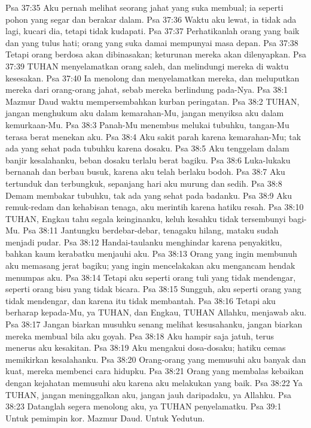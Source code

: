 Psa 37:35  Aku pernah melihat seorang jahat yang suka membual; ia seperti pohon yang segar dan berakar dalam.
Psa 37:36  Waktu aku lewat, ia tidak ada lagi, kucari dia, tetapi tidak kudapati.
Psa 37:37  Perhatikanlah orang yang baik dan yang tulus hati; orang yang suka damai mempunyai masa depan.
Psa 37:38  Tetapi orang berdosa akan dibinasakan; keturunan mereka akan dilenyapkan.
Psa 37:39  TUHAN menyelamatkan orang saleh, dan melindungi mereka di waktu kesesakan.
Psa 37:40  Ia menolong dan menyelamatkan mereka, dan meluputkan mereka dari orang-orang jahat, sebab mereka berlindung pada-Nya.
Psa 38:1  Mazmur Daud waktu mempersembahkan kurban peringatan.
Psa 38:2  TUHAN, jangan menghukum aku dalam kemarahan-Mu, jangan menyiksa aku dalam kemurkaan-Mu.
Psa 38:3  Panah-Mu menembus melukai tubuhku, tangan-Mu terasa berat menekan aku.
Psa 38:4  Aku sakit parah karena kemarahan-Mu; tak ada yang sehat pada tubuhku karena dosaku.
Psa 38:5  Aku tenggelam dalam banjir kesalahanku, beban dosaku terlalu berat bagiku.
Psa 38:6  Luka-lukaku bernanah dan berbau busuk, karena aku telah berlaku bodoh.
Psa 38:7  Aku tertunduk dan terbungkuk, sepanjang hari aku murung dan sedih.
Psa 38:8  Demam membakar tubuhku, tak ada yang sehat pada badanku.
Psa 38:9  Aku remuk-redam dan kehabisan tenaga, aku merintih karena hatiku resah.
Psa 38:10  TUHAN, Engkau tahu segala keinginanku, keluh kesahku tidak tersembunyi bagi-Mu.
Psa 38:11  Jantungku berdebar-debar, tenagaku hilang, mataku sudah menjadi pudar.
Psa 38:12  Handai-taulanku menghindar karena penyakitku, bahkan kaum kerabatku menjauhi aku.
Psa 38:13  Orang yang ingin membunuh aku memasang jerat bagiku; yang ingin mencelakakan aku mengancam hendak menumpas aku.
Psa 38:14  Tetapi aku seperti orang tuli yang tidak mendengar, seperti orang bisu yang tidak bicara.
Psa 38:15  Sungguh, aku seperti orang yang tidak mendengar, dan karena itu tidak membantah.
Psa 38:16  Tetapi aku berharap kepada-Mu, ya TUHAN, dan Engkau, TUHAN Allahku, menjawab aku.
Psa 38:17  Jangan biarkan musuhku senang melihat kesusahanku, jangan biarkan mereka membual bila aku goyah.
Psa 38:18  Aku hampir saja jatuh, terus menerus aku kesakitan.
Psa 38:19  Aku mengakui dosa-dosaku; hatiku cemas memikirkan kesalahanku.
Psa 38:20  Orang-orang yang memusuhi aku banyak dan kuat, mereka membenci cara hidupku.
Psa 38:21  Orang yang membalas kebaikan dengan kejahatan memusuhi aku karena aku melakukan yang baik.
Psa 38:22  Ya TUHAN, jangan meninggalkan aku, jangan jauh daripadaku, ya Allahku.
Psa 38:23  Datanglah segera menolong aku, ya TUHAN penyelamatku.
Psa 39:1  Untuk pemimpin kor. Mazmur Daud. Untuk Yedutun.
